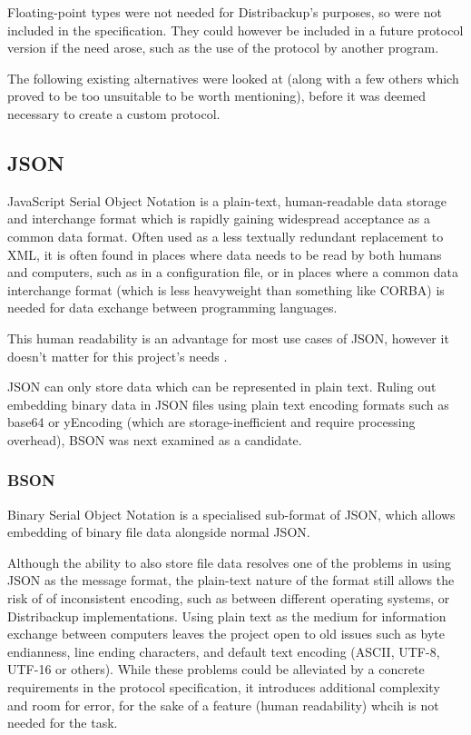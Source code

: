 \documentclass[12pt,a4paper,]{adreport}
\begin{document}
Floating-point types were not needed for Distribackup's purposes, so
were not included in the specification. They could however be included
in a future protocol version if the need arose, such as the use of the
protocol by another program.

The following existing alternatives were looked at (along with a few
others which proved to be too unsuitable to be worth mentioning), before
it was deemed necessary to create a custom protocol.

\subsection{JSON}\label{json}

JavaScript Serial Object Notation is a plain-text, human-readable data
storage and interchange format which is rapidly gaining widespread
acceptance as a common data format. Often used as a less textually
redundant replacement to XML, it is often found in places where data
needs to be read by both humans and computers, such as in a
configuration file, or in places where a common data interchange format
(which is less heavyweight than something like CORBA) is needed for data
exchange between programming languages.

This human readability is an advantage for most use cases of JSON,
however it doesn't matter for this project's needs .

JSON can only store data which can be represented in plain text. Ruling
out embedding binary data in JSON files using plain text encoding
formats such as base64 or yEncoding (which are storage-inefficient and
require processing overhead), BSON was next examined as a candidate.

\subsubsection{BSON}\label{bson}

Binary Serial Object Notation is a specialised sub-format of JSON, which
allows embedding of binary file data alongside normal JSON.

Although the ability to also store file data resolves one of the
problems in using JSON as the message format, the plain-text nature of
the format still allows the risk of of inconsistent encoding, such as
between different operating systems, or Distribackup implementations.
Using plain text as the medium for information exchange between
computers leaves the project open to old issues such as byte endianness,
line ending characters, and default text encoding (ASCII, UTF-8, UTF-16
or others). While these problems could be alleviated by a concrete
requirements in the protocol specification, it introduces additional
complexity and room for error, for the sake of a feature (human
readability) whcih is not needed for the task.
\end{document}
